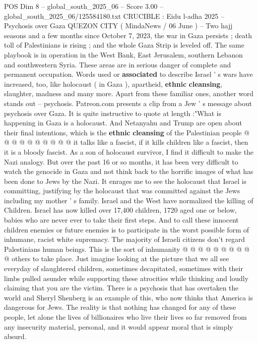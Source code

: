 \begin{textsample}{POS Dim 8 – global\_south\_2025\_06 – Score 3.00 – global\_south\_2025\_06/125584180.txt}  \label{ex:f8_pos_199}
CRUCIBLE : Eidu l-adha 2025 -- Psychosis over Gaza QUEZON CITY ( MindaNews / 06 June ) -- Two hajj seasons and a few months since October 7, 2023, the war in Gaza persists ; death toll of Palestinians is rising ; and the whole Gaza Strip is leveled off.
The same playbook is in operation in the West Bank, East Jerusalem, southern Lebanon and southwestern Syria.
These areas are in serious danger of complete and permanent occupation.
Words used or \textbf{associated} to describe Israel ' s wars have increased, too, like holocaust ( in Gaza ), apartheid, \textbf{ethnic} \textbf{cleansing}, slaughter, madness and many more.
Apart from these familiar ones, another word stands out -- psychosis.
Patreon.com presents a clip from a Jew ' s message about psychosis over Gaza.
It is quite instructive to quote at length :"What is happening in Gaza is a holocaust.
And Netanyahu and Trump are open about their final intentions, which is the \textbf{ethnic} \textbf{cleansing} of the Palestinian people @ @ @ @ @ @ @ @ @ @ it talks like a fascist, if it kills children like a fascist, then it is a bloody fascist.
As a son of holocaust survivor, I find it difficult to make the Nazi analogy.
But over the past 16 or so months, it has been very difficult to watch the genocide in Gaza and not think back to the horrific images of what has been done to Jews by the Nazi.
It enrages me to see the holocaust that Israel is committing, justifying by the holocaust that was committed against the Jews including my mother ' s family.
Israel and the West have normalized the killing of Children.
Israel has now killed over 17,400 children, 1720 aged one or below, babies who are never ever to take their first steps.
And to call these innocent children enemies or future enemies is to participate in the worst possible form of inhumane, racist white supremacy.
The majority of Israeli citizens don't regard Palestinians human beings.
This is the sort of inhumanity @ @ @ @ @ @ @ @ @ @ others to take place.
Just imagine looking at the picture that we all see everyday of slaughtered children, sometimes decapitated, sometimes with their limbs pulled asunder while supporting these atrocities while thinking and loudly claiming that you are the victim.
There is a psychosis that has overtaken the world and Sheryl Shenberg is an example of this, who now thinks that America is dangerous for Jews.
The reality is that nothing has changed for any of these people, let alone the lives of billionaires who live their lives so far removed from any insecurity material, personal, and it would appear moral that is simply absurd.

\end{textsample}
